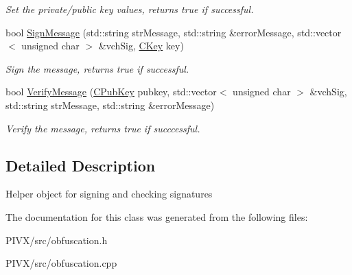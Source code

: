\begin{DoxyCompactItemize}
\begin{DoxyCompactList}\small\item\em Set the private/public key values, returns true if successful. \end{DoxyCompactList}\item 
\mbox{\label{class_c_obfu_scation_signer_a004eab16d18045b42d51037eab817585}} 
bool \mbox{\hyperlink{class_c_obfu_scation_signer_a004eab16d18045b42d51037eab817585}{Sign\+Message}} (std\+::string str\+Message, std\+::string \&error\+Message, std\+::vector$<$ unsigned char $>$ \&vch\+Sig, \mbox{\hyperlink{class_c_key}{C\+Key}} key)
\begin{DoxyCompactList}\small\item\em Sign the message, returns true if successful. \end{DoxyCompactList}\item 
\mbox{\label{class_c_obfu_scation_signer_aaf770086b8defa6568da76bee8fb5269}} 
bool \mbox{\hyperlink{class_c_obfu_scation_signer_aaf770086b8defa6568da76bee8fb5269}{Verify\+Message}} (\mbox{\hyperlink{class_c_pub_key}{C\+Pub\+Key}} pubkey, std\+::vector$<$ unsigned char $>$ \&vch\+Sig, std\+::string str\+Message, std\+::string \&error\+Message)
\begin{DoxyCompactList}\small\item\em Verify the message, returns true if succcessful. \end{DoxyCompactList}\end{DoxyCompactItemize}


\subsection{Detailed Description}
Helper object for signing and checking signatures 

The documentation for this class was generated from the following files\+:\begin{DoxyCompactItemize}
\item 
P\+I\+V\+X/src/obfuscation.\+h\item 
P\+I\+V\+X/src/obfuscation.\+cpp\end{DoxyCompactItemize}
